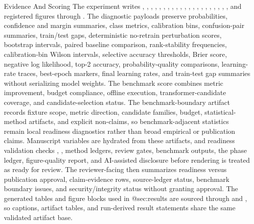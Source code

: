 \documentclass[
  ignorenonframetext,
]{beamer}
\begin{document}
\begin{frame}{Evidence And Scoring}
\protect{}\label{sec:evidence-scoring}
The experiment writes ,
,
,
,
,
,
,
,
,
,
,
,
,
,
,
,
,
,
,
,
, and registered
figures through . The
diagnostic payloads preserve probabilities, confidence and margin
summaries, class metrics, calibration bins, confusion-pair summaries,
train/test gaps, deterministic no-retrain perturbation scores, bootstrap
intervals, paired baseline comparison, rank-stability frequencies,
calibration-bin Wilson intervals, selective accuracy thresholds, Brier
score, negative log likelihood, top-2 accuracy, probability-quality
comparisons, learning-rate traces, best-epoch markers, final learning
rates, and train-test gap summaries without serializing model weights.
The benchmark score combines metric improvement, budget compliance,
offline execution, transformer-candidate coverage, and
candidate-selection status. The benchmark-boundary artifact records
fixture scope, metric direction, candidate families, budget,
statistical-method artifacts, and explicit non-claims, so
benchmark-adjacent statistics remain local readiness diagnostics rather
than broad empirical or publication claims. Manuscript variables are
hydrated from these artifacts, and readiness validation checks
,
, method ledgers, review
gates, benchmark outputs, the phase ledger, figure-quality report, and
AI-assisted disclosure before rendering is treated as ready for review.
The reviewer-facing
 then
summarizes readiness versus publication approval, claim-evidence rows,
source-ledger status, benchmark boundary issues, and security/integrity
status without granting approval. The generated tables and figure blocks
used in @sec:results are sourced through
 and
, so captions,
artifact tables, and run-derived result statements share the same
validated artifact base.


\end{frame}
\end{document}
